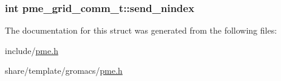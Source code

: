 \hypertarget{structpme__grid__comm__t_a3ad105ea25033c0e636b1461685f8e6a}{
\subsubsection[{send\-\_\-nindex}]{\setlength{\rightskip}{0pt plus 5cm}int {\bf pme\-\_\-grid\-\_\-comm\-\_\-t\-::send\-\_\-nindex}}}\label{structpme__grid__comm__t_a3ad105ea25033c0e636b1461685f8e6a}


\-The documentation for this struct was generated from the following files\-:\begin{DoxyCompactItemize}
\item 
include/\hyperlink{include_2pme_8h}{pme.\-h}\item 
share/template/gromacs/\hyperlink{share_2template_2gromacs_2pme_8h}{pme.\-h}\end{DoxyCompactItemize}
